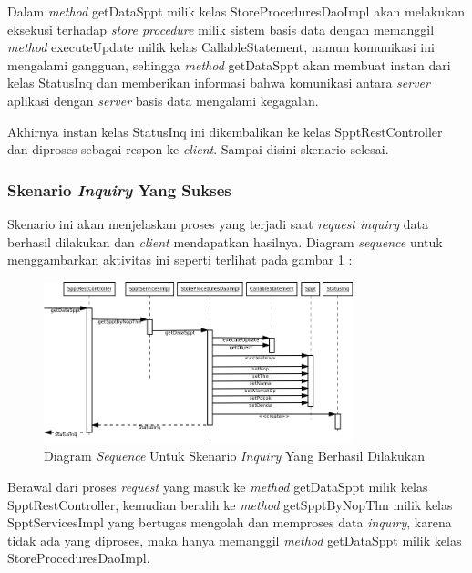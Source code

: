 \documentclass[pdftex,12pt, oneside]{article}
\begin{document}
Dalam \textit{method} getDataSppt milik kelas StoreProceduresDaoImpl akan melakukan eksekusi terhadap \textit{store procedure} milik sistem basis data dengan memanggil \textit{method} executeUpdate milik kelas CallableStatement, namun komunikasi ini mengalami gangguan, sehingga \textit{method} getDataSppt akan membuat instan dari kelas StatusInq dan memberikan informasi bahwa komunikasi antara \textit{server} aplikasi dengan \textit{server} basis data mengalami kegagalan. 

Akhirnya instan kelas StatusInq ini dikembalikan ke kelas SpptRestController dan diproses sebagai respon ke \textit{client}. Sampai disini skenario selesai.

\subsubsection{Skenario \textit{Inquiry} Yang Sukses}

Skenario ini akan menjelaskan proses yang terjadi saat \textit{request inquiry} data berhasil dilakukan dan \textit{client} mendapatkan hasilnya. Diagram \textit{sequence} untuk menggambarkan aktivitas ini seperti terlihat pada gambar \ref{fig:uml-seq-inquiry} :

\begin{figure}[H]
  \centering
  \includegraphics[width=0.8\textwidth]{./resources/diagram/uml-seq-inquiry}
  \caption{Diagram \textit{Sequence} Untuk Skenario \textit{Inquiry} Yang Berhasil Dilakukan}
  \label{fig:uml-seq-inquiry}
\end{figure}

Berawal dari proses \textit{request} yang masuk ke \textit{method} getDataSppt milik kelas SpptRestController, kemudian beralih ke \textit{method} getSpptByNopThn milik kelas SpptServicesImpl yang bertugas mengolah dan memproses data \textit{inquiry}, karena tidak ada yang diproses, maka hanya memanggil \textit{method} getDataSppt milik kelas StoreProceduresDaoImpl.
\end{document}
